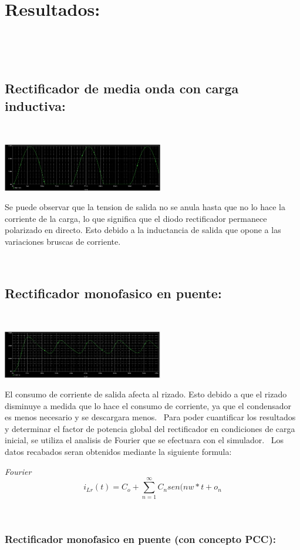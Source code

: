 \documentclass[12pt,letterpaper]{article}
\begin{document}
\

\section{Resultados:}
\

\

\subsection{Rectificador de media onda con carga inductiva:}
\

\includegraphics[width=7cm]{Resultado Circuito 1-2.png} 
\

Se puede observar que la tension de salida no se anula hasta que no lo hace la corriente de la carga, lo que significa que el diodo rectificador permanece polarizado en directo. Esto debido a la inductancia de salida que opone a las variaciones bruscas de corriente.
\

\

\subsection{Rectificador monofasico en puente:}
\

\includegraphics[width=7cm]{Resultado Circuito 1-3.png} 
\

El consumo de corriente de salida afecta al rizado. Esto debido a que el rizado disminuye a medida que lo hace el consumo de corriente, ya que el condensador es menos necesario y se descargara menos.
\
Para poder cuantificar los resultados y determinar el factor de potencia global del rectificador en condiciones de carga inicial, se utiliza el analisis de Fourier que se efectuara con el simulador.
\
Los datos recabados seran obtenidos mediante la siguiente formula:
\

\emph{Fourier}
$$ i_{Lr}(t)= C_o + \sum_{n=1}^{\infty} C_n sen(nw*t + o_n$$

\

\subsubsection{Rectificador monofasico en puente (con concepto PCC):}
\
\end{document}
